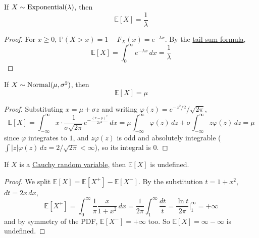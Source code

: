   \begin{theorem}
    \label{thm:expectation-of-exponential}
    If \hyperref[def:exponential-random-variable]{$X \sim \operatorname{Exponential}(\lambda)$}, then 
    \begin{equation}
      \mathbb{E}[X] = \frac{1}{\lambda}
    \end{equation}
  \end{theorem}
  \begin{proof}
    For $x \geq 0$, $\mathbb{P}(X > x) = 1 - F_X (x) = e^{-\lambda x}$. By the \hyperref[thm:tail-sum-formula]{tail sum formula}, 
    \begin{equation}
      \mathbb{E}[X] = \int_0^\infty e^{-\lambda x} \,dx = \frac{1}{\lambda}
    \end{equation}
  \end{proof}

  \begin{theorem}
    \label{thm:expectation-of-gaussian}
    If \hyperref[def:gaussian-random-variable]{$X \sim \operatorname{Normal}(\mu, \sigma^2)$}, then 
    \begin{equation}
      \mathbb{E}[X] = \mu
    \end{equation}
  \end{theorem}
  \begin{proof}
    Substituting $x = \mu + \sigma z$ and writing $\varphi(z) = e^{-z^2/2} / \sqrt{2\pi}$, 
    \begin{equation}
      \mathbb{E}[X] = \int_{-\infty}^\infty x \cdot \frac{1}{\sigma \sqrt{2\pi}} e^{-\frac{(x - \mu)^2}{2 \sigma^2}} \, dx = \mu \int_{-\infty}^\infty \varphi(z) \,dz + \sigma \int_{-\infty}^\infty z \varphi(z) \,dz = \mu
    \end{equation}
    since $\varphi$ integrates to $1$, and $z \varphi(z)$ is odd and absolutely integrable ($\int |z| \varphi(z) \,dz = 2/\sqrt{2\pi} < \infty$), so its integral is $0$. 
  \end{proof}

  \begin{theorem}
    \label{thm:expectation-of-cauchy}
    If $X$ is a \hyperref[def:cauchy-random-variable-standardized]{Cauchy random variable}, then $\mathbb{E}[X]$ is undefined. 
  \end{theorem}
  \begin{proof}
    We split $\mathbb{E}[X] = \mathbb{E}[X^+] - \mathbb{E}[X^-]$. By the substitution $t = 1 + x^2$, $dt = 2x \,dx$, 
    \begin{equation}
      \mathbb{E}[X^+] = \int_0^\infty \frac{1}{\pi} \frac{x}{1 + x^2} \,dx = \frac{1}{2\pi} \int_1^\infty \frac{dt}{t} = \frac{\ln t}{2 \pi} \bigg|_1^\infty = +\infty
    \end{equation}
    and by symmetry of the PDF, $\mathbb{E}[X^-] = +\infty$ too. So $\mathbb{E}[X] = \infty - \infty$ is undefined. 
  \end{proof}

